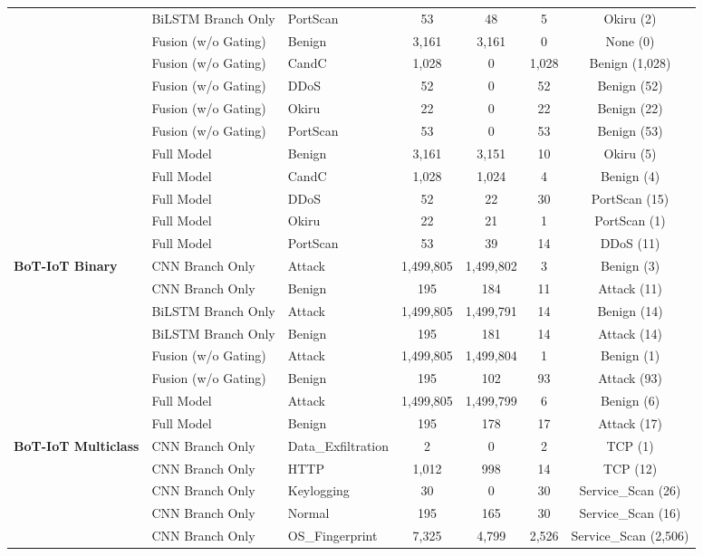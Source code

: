 \documentclass[a4paper,fleqn]{cas-sc}
\begin{document}
\begin{landscape}
\begin{longtable}{lllcccc}
 & BiLSTM Branch Only & PortScan & 53 & 48 & 5 & Okiru (2) \\
 & Fusion (w/o Gating) & Benign & 3,161 & 3,161 & 0 & None (0) \\
 & Fusion (w/o Gating) & CandC & 1,028 & 0 & 1,028 & Benign (1,028) \\
 & Fusion (w/o Gating) & DDoS & 52 & 0 & 52 & Benign (52) \\
 & Fusion (w/o Gating) & Okiru & 22 & 0 & 22 & Benign (22) \\
 & Fusion (w/o Gating) & PortScan & 53 & 0 & 53 & Benign (53) \\
 & Full Model & Benign & 3,161 & 3,151 & 10 & Okiru (5) \\
 & Full Model & CandC & 1,028 & 1,024 & 4 & Benign (4) \\
 & Full Model & DDoS & 52 & 22 & 30 & PortScan (15) \\
 & Full Model & Okiru & 22 & 21 & 1 & PortScan (1) \\
 & Full Model & PortScan & 53 & 39 & 14 & DDoS (11) \\
\midrule
\multirow{8}{*}{\textbf{BoT-IoT Binary}} & CNN Branch Only & Attack & 1,499,805 & 1,499,802 & 3 & Benign (3) \\
 & CNN Branch Only & Benign & 195 & 184 & 11 & Attack (11) \\
 & BiLSTM Branch Only & Attack & 1,499,805 & 1,499,791 & 14 & Benign (14) \\
 & BiLSTM Branch Only & Benign & 195 & 181 & 14 & Attack (14) \\
 & Fusion (w/o Gating) & Attack & 1,499,805 & 1,499,804 & 1 & Benign (1) \\
 & Fusion (w/o Gating) & Benign & 195 & 102 & 93 & Attack (93) \\
 & Full Model & Attack & 1,499,805 & 1,499,799 & 6 & Benign (6) \\
 & Full Model & Benign & 195 & 178 & 17 & Attack (17) \\
\midrule
\multirow{32}{*}{\textbf{BoT-IoT Multiclass}} & CNN Branch Only & Data\_Exfiltration & 2 & 0 & 2 & TCP (1) \\
 & CNN Branch Only & HTTP & 1,012 & 998 & 14 & TCP (12) \\
 & CNN Branch Only & Keylogging & 30 & 0 & 30 & Service\_Scan (26) \\
 & CNN Branch Only & Normal & 195 & 165 & 30 & Service\_Scan (16) \\
 & CNN Branch Only & OS\_Fingerprint & 7,325 & 4,799 & 2,526 & Service\_Scan (2,506) \\

\end{longtable}
\end{landscape}
\end{document}
